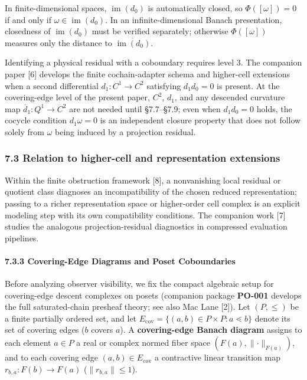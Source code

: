 \documentclass[
  11pt,
]{article}
\begin{document}
In finite-dimensional spaces, \(\operatorname{im}(d_0)\) is automatically closed, so \(\Phi([\omega])=0\) if and only if \(\omega\in\operatorname{im}(d_0)\). In an infinite-dimensional Banach presentation, closedness of \(\operatorname{im}(d_0)\) must be verified separately; otherwise \(\Phi([\omega])\) measures only the distance to \(\overline{\operatorname{im}(d_0)}\).

Identifying a physical residual with a coboundary requires level 3. The companion paper {[}6{]} develops the finite cochain-adapter schema and higher-cell extensions when a second differential \(d_1:C^1\to C^2\) satisfying \(d_1d_0=0\) is present. At the covering-edge level of the present paper, \(C^2\), \(d_1\), and any descended curvature map \(\overline d_1:Q^1\to C^2\) are not needed until §7.7--§7.9; even when \(d_1d_0=0\) holds, the cocycle condition \(d_1\omega=0\) is an independent closure property that does not follow solely from \(\omega\) being induced by a projection residual.

\subsubsection{7.3 Relation to higher-cell and representation extensions}\label{relation-to-higher-cell-and-representation-extensions}

Within the finite obstruction framework {[}8{]}, a nonvanishing local residual or quotient class diagnoses an incompatibility of the chosen reduced representation; passing to a richer representation space or higher-order cell complex is an explicit modeling step with its own compatibility conditions. The companion work {[}7{]} studies the analogous projection-residual diagnostics in compressed evaluation pipelines.

\paragraph{7.3.3 Covering-Edge Diagrams and Poset Coboundaries}\label{covering-edge-diagrams-and-poset-coboundaries}

Before analyzing observer visibility, we fix the compact algebraic setup for covering-edge descent complexes on posets (companion package \textbf{PO-001} develops the full saturated-chain presheaf theory; see also Mac Lane {[}2{]}). Let \((P, \le)\) be a finite partially ordered set, and let \(E_{\mathrm{cov}} = \{(a,b) \in P \times P : a \lessdot b\}\) denote its set of covering edges (\(b\) covers \(a\)). A \textbf{covering-edge Banach diagram} assigns to each element \(a \in P\) a real or complex normed fiber space \((F(a), \lVert\cdot\rVert_{F(a)})\), and to each covering edge \((a,b) \in E_{\mathrm{cov}}\) a contractive linear transition map \(r_{b,a}: F(b) \to F(a)\) (\(\lVert r_{b,a}\rVert \le 1\)).
\end{document}
